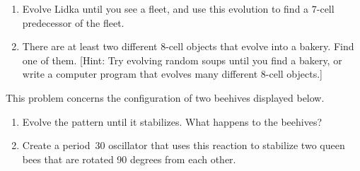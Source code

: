 \begin{multicols}{2}
\begin{problemstar}
\begin{center}\captionsetup[subfigure]{labelformat=empty}
	\begin{minipage}{.4\linewidth}
		\centering {}
	\end{minipage} \quad %
	\begin{minipage}{.4\linewidth}
		\centering {}
	\end{minipage}
\end{center}

\begin{enumerate}[label=\bf\color{ocre}(\alph*)]
	\item Evolve Lidka until you see a fleet, and use this evolution to find a $7$-cell predecessor of the fleet.
	
	\item There are at least two different $8$-cell objects that evolve into a bakery. Find one of them. [Hint: Try evolving random soups until you find a bakery, or write a computer program that evolves many different $8$-cell objects.]
\end{enumerate}
\end{problemstar}


\mfilbreak


\begin{problemstar}\label{exer:beehive_pair}
	This problem concerns the configuration of two beehives displayed below.
	
	\begin{center}
	\end{center}

	\begin{enumerate}[label=\bf\color{ocre}(\alph*)]\vspace*{-0.25cm}
		\item Evolve the pattern until it stabilizes. What happens to the beehives?
		
		\item Create a period~30 oscillator that uses this reaction to stabilize two queen bees that are rotated 90 degrees from each other.
	\end{enumerate}
\end{problemstar}


\mfilbreak



\end{multicols}
